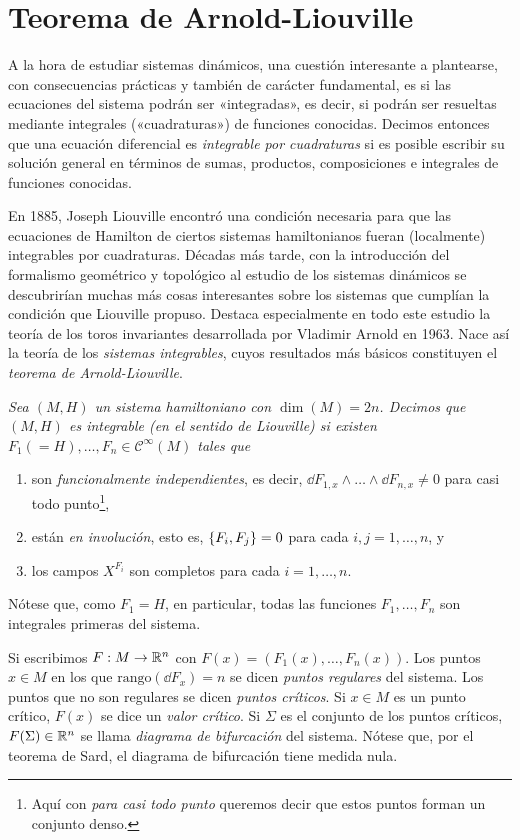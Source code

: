 \section{Teorema de Arnold-Liouville}\label{sec:arnoldliouville}
A la hora de estudiar sistemas dinámicos, una cuestión interesante a plantearse, con consecuencias prácticas y también de carácter fundamental, es si las ecuaciones del sistema podrán ser «integradas», es decir, si podrán ser resueltas mediante integrales («cuadraturas») de funciones conocidas. Decimos entonces que una ecuación diferencial es \emph{integrable por cuadraturas} si es posible escribir su solución general en términos de sumas, productos, composiciones e integrales de funciones conocidas. 

En 1885, Joseph Liouville encontró una condición necesaria para que las ecuaciones de Hamilton de ciertos sistemas hamiltonianos fueran (localmente) integrables por cuadraturas. Décadas más tarde, con la introducción del formalismo geométrico y topológico al estudio de los sistemas dinámicos se descubrirían muchas más cosas interesantes sobre los sistemas que cumplían la condición que Liouville propuso. Destaca especialmente en todo este estudio la teoría de los toros invariantes desarrollada por Vladimir Arnold en 1963. Nace así la teoría de los \emph{sistemas integrables}, cuyos resultados más básicos constituyen el \emph{teorema de Arnold-Liouville}.

\begin{defn}
  \em
  Sea $(M,H)$ un sistema hamiltoniano con $\dim(M)=2n$. Decimos que $(M,H)$ es \emph{integrable (en el sentido de Liouville)} si existen $F_1(=H),\dots,F_n\in \mathcal{C}^{\infty}(M)$ tales que
\begin{enumerate}
  \item son \emph{funcionalmente independientes}, es decir, $\dd F_{1,x}\wedge \dots \wedge \dd F_{n,x}\neq 0$ para casi todo punto\footnote{Aquí con \emph{para casi todo punto} queremos decir que estos puntos forman un conjunto denso.}, 
  \item están \emph{en involución}, esto es, $\left\lbrace F_i,F_j\right\rbrace=0$ para cada $i,j=1,\dots,n$, y
  \item  los campos $X^{F_i}$ son completos para cada $i=1,\dots,n$. 
\end{enumerate}
Nótese que, como $F_1=H$, en particular, todas las funciones $F_1,\dots,F_n$ son integrales primeras del sistema.

Si escribimos $F:M\rightarrow \mathbb{R}^n$ con $F(x)=(F_1(x),\dots,F_n(x))$. Los puntos $x\in M$ en los que $\mathrm{rango} (\dd F_x) =n$ se dicen \emph{puntos regulares} del sistema. Los puntos que no son regulares se dicen \emph{puntos críticos}. Si $x\in M$ es un punto crítico, $F(x)$ se dice un \emph{valor crítico}. Si $\Sigma$ es el conjunto de los puntos críticos, $F(\Sigma)\in \mathbb{R}^n$ se llama \emph{diagrama de bifurcación} del sistema.
 Nótese que, por el teorema de Sard, el diagrama de bifurcación tiene medida nula.
\end{defn}

